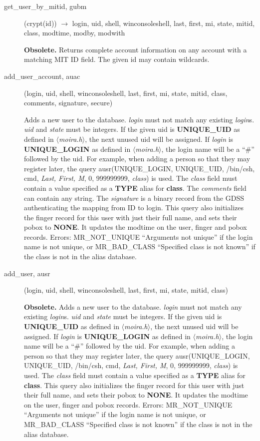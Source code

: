 \documentclass{article}
\begin{document}
\begin{description}
\item[get\_user\_by\_mitid, gubm](crypt(id)) $\rightarrow$ login, uid,
shell, winconsoleshell, last, first,
mi, state, mitid, class, modtime, modby, modwith

{\bf Obsolete.}  Returns complete account information on any account
with a matching MIT ID field.  The given id may contain wildcards.

\item[add\_user\_account, auac](login, uid, shell, winconsoleshell, last, first, mi, state, mitid,
class, comments, signature, secure)

Adds a new user to the database. {\em login} must not match any
existing {\em login}s. {\em uid} and {\em state} must be integers. If
the given uid is {\bf UNIQUE\_UID} as defined in {\em
$\langle$moira.h$\rangle$}, the next unused uid will be assigned. If
{\em login} is {\bf UNIQUE\_LOGIN} as defined in {\em
$\langle$moira.h$\rangle$}, the login name will be a ``\#'' followed by
the uid. For example, when adding a person so that they may register
later, the query ausr(UNIQUE\_LOGIN, UNIQUE\_UID, /bin/csh, cmd, {\em Last,
First, M}, 0, 999999999, {\em class}) is used. The {\em class}
field must contain a value specified as a {\bf TYPE} alias for {\bf
class}. The {\em comments} field can contain any string. The {\em
signature} is a binary record from the GDSS authenticating the mapping
from ID to login. This query also initializes the finger record for
this user with just their full name, and sets their pobox to {\bf
NONE}. It updates the modtime on the user, finger and pobox records.
Errors: MR\_NOT\_UNIQUE ``Arguments not unique'' if the login name is not
unique, or MR\_BAD\_CLASS ``Specified class is not known'' if the class is
not in the alias database.

\item[add\_user, ausr](login, uid, shell, winconsoleshell, last, first, mi, state, mitid,
class)

{\bf Obsolete.} Adds a new user to the database. {\em login} must not
match any existing {\em login}s. {\em uid} and {\em state} must be
integers. If the given uid is {\bf UNIQUE\_UID} as defined in {\em
$\langle$moira.h$\rangle$}, the next unused uid will be assigned. If
{\em login} is {\bf UNIQUE\_LOGIN} as defined in {\em
$\langle$moira.h$\rangle$}, the login name will be a ``\#'' followed by
the uid. For example, when adding a person so that they may register
later, the query ausr(UNIQUE\_LOGIN, UNIQUE\_UID, /bin/csh, cmd, {\em Last,
First, M}, 0, 999999999, {\em class}) is used. The {\em class} field
must contain a value specified as a {\bf TYPE} alias for {\bf class}.
This query also initializes the finger record for this user with just
their full name, and sets their pobox to {\bf NONE}. It updates the
modtime on the user, finger and pobox records. Errors: MR\_NOT\_UNIQUE
``Arguments not unique'' if the login name is not unique, or
MR\_BAD\_CLASS ``Specified class is not known'' if the class is not in the
alias database.


\end{description}
\end{document}
